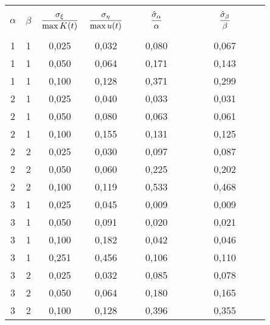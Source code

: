 \begin{multicols}{2}
\begin{table*}
\begin{center}
\tabcolsep=13pt
\begin{tabular}{|c|c|c|c|c|c|}
\hline&&&&&\\[-9pt]
$\alpha$&$\beta$&$\displaystyle\frac{\displaystyle \sigma_\xi\mathstrut}{\displaystyle \max K(t)\mathstrut}$&$\displaystyle\frac{\displaystyle \sigma_\eta\mathstrut}{\displaystyle \max u(t)\mathstrut}$&
$\ \ \ \ \ \ \fr{\hat\sigma_\alpha}{\alpha}\ \  \ \ \ \ $&\ \ \ \ \ \  $\displaystyle\frac{\displaystyle  \hat\sigma_\beta\mathstrut}{\displaystyle \beta\mathstrut}$\ \ \  \ \ \ \\
&&&&&\\[-9pt]
\hline
1&1&0,025&0,032&0,080&0,067\\
1&1&0,050&0,064&0,171&0,143\\
1&1&0,100&0,128&0,371&0,299\\
2&1&0,025&0,040&0,033&0,031\\
2&1&0,050&0,080&0,063&0,061\\
2&1&0,100&0,155&0,131&0,125\\
2&2&0,025&0,030&0,097&0,087\\
2&2&0,050&0,060&0,225&0,202\\
2&2&0,100&0,119&0,533&0,468\\
3&1&0,025&0,045&0,009&0,009\\
3&1&0,050&0,091&0,020&0,021\\
3&1&0,100&0,182&0,042&0,046\\
3&1&0,251&0,456&0,106&0,110\\
3&2&0,025&0,032&0,085&0,078\\
3&2&0,050&0,064&0,180&0,165\\
3&2&0,100&0,128&0,396&0,355\\
\hline
\end{tabular}
\end{center}
\end{table*}


\end{multicols}

